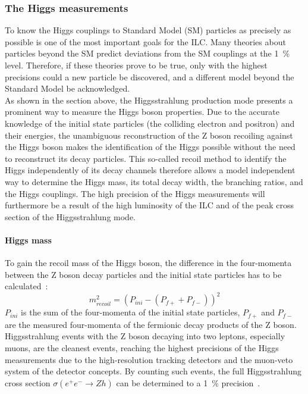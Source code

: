 \subsubsection{The Higgs measurements}
To know the Higgs couplings to Standard Model (SM) particles as precisely as possible is one of the most important goals for the ILC.
Many theories about particles beyond the SM predict deviations from the SM couplings at the \SI{1}{\percent} level.
Therefore, if these theories prove to be true, only with the highest precisions could a new particle be discovered, and a different model beyond the Standard Model be acknowledged.
\\As shown in the section above, the Higgsstrahlung production mode presents a prominent way to measure the Higgs boson properties.
Due to the accurate knowledge of the initial state particles (the colliding electron and positron) and their energies, the unambiguous reconstruction of the Z boson recoiling against the Higgs boson makes the identification of the Higgs possible without the need to reconstruct its decay particles.
This so-called recoil method to identify the Higgs independently of its decay channels therefore allows a model independent way to determine the Higgs mass, its total decay width, the branching ratios, and the Higgs couplings. 
The high precision of the Higgs measurements will furthermore be a result of the high luminosity of the ILC and of the peak cross section of the Higgsstrahlung mode.

\paragraph{Higgs mass}
To gain the recoil mass of the Higgs boson, the difference in the four-momenta between the Z boson decay particles and the initial state particles has to be calculated~\cite[p. 7]{ILCPhysics}:
\begin{equation}
 m_{recoil}^2=(P_{ini}-(P_{f+}+P_{f-}))^2
\end{equation}
$P_{ini}$ is the sum of the four-momenta of the initial state particles, $P_{f+}$ and $P_{f-}$ are the measured four-momenta of the fermionic decay products of the Z boson.\\
Higgsstrahlung events with the Z boson decaying into two leptons, especially muons, are the cleanest events, reaching the highest precisions of the Higgs measurements due to the high-resolution tracking detectors and the muon-veto system of the detector concepts.
By counting such events, the full Higgsstrahlung cross section $\sigma(e^+e^-\rightarrow Zh)$ can be determined to a \SI{1}{\percent} precision~\cite[p. 12]{PhysicsCase}.


